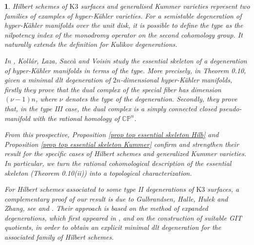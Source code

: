 \documentclass{amsart}%
\numberwithin{equation}{subsection}
\theoremstyle{plain2}
\theoremstyle{definition2}
\theoremstyle{stepstyle}
\theoremstyle{point}
\theoremstyle{subpoint}
\newtheorem{subpoint}[equation]{}%
\newcommand{\spa}[1]{\begin{subpoint}#1\end{subpoint}}           %
\newcommand{\CP}{\ensuremath{\mathbb{CP}}}
\begin{document}
\spa{Hilbert schemes of $\text{K}3$ surfaces and generalised Kummer varieties represent two families of examples of hyper-K\"{a}hler varieties. For a semistable degeneration of hyper-K\"{a}hler manifolds over the unit disk, it is possible to define the type as the nilpotency index of the monodromy operator on the second cohomology group. It naturally extends the definition for Kulikov degenerations.

In \cite{KollarLazaSaccaEtAl2017}, Koll\'{a}r, Laza, Sacc\`{a} and Voisin study the essential skeleton of a degeneration of hyper-K\"{a}hler manifolds in terms of the type. More precisely, in Theorem 0.10, given a minimal dlt degeneration of $2n$-dimensional hyper-K\"{a}hler manifolds, firstly they prove that the dual complex of the special fiber has dimension $(\nu-1)n$, where $\nu$ denotes the type of the degeneration. Secondly, they prove that, in the type III case, the dual complex is a simply connected closed pseudo-manifold with the rational homology of $\CP^n$.

From this prospective, Proposition \ref{prop top essential skeleton Hilb} and Proposition \ref{prop top essential skeleton Kummer} confirm and strengthen their result for the specific cases of Hilbert schemes and generalized Kummer varieties. In particular, we turn the rational cohomological description of the essential skeleton (Theorem 0.10(ii)) into a topological characterization.

For Hilbert schemes associated to some type II degenerations of $\text{K}3$ surfaces, a complementary proof of our result is due to Gulbrandsen, Halle, Hulek and Zhang, see \cite{GulbrandsenHalleHulek2016} and \cite{GulbrandsenHalleHulekEtAl}. Their approach is based on the method of \textit{expanded degenerations}, which first appeared in \cite{Li}, and on the construction of suitable GIT quotients, in order to obtain an explicit minimal dlt degeneration for the associated family of Hilbert schemes.
}
\end{document}
